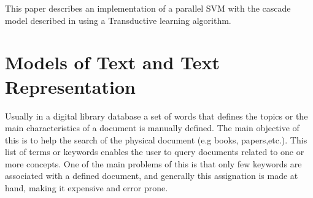 
This paper describes an implementation of a parallel SVM with the
cascade model described in \cite{GrafCBDV04} using a Transductive
learning algorithm. 

%
\section{Models of Text and Text Representation\label{sub:Models-of-Text}}
%

Usually in a digital library database a set of words that defines
the topics or the main characteristics of a document is manually defined.
The main objective of this is to help the search of the physical document
(e.g books, papers,etc.). This list of terms or keywords enables the
user to query documents related to one or more concepts. One of the
main problems of this is that only few keywords are associated with
a defined document, and generally this assignation is made at hand,
making it expensive and error prone.

